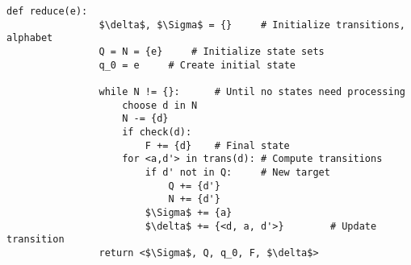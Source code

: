 \documentclass[11pt]{article}
\begin{document}
		\begin{lstlisting}[autogobble=true,mathescape]
			def reduce(e):
				$\delta$, $\Sigma$ = {}		# Initialize transitions, alphabet
				Q = N = {e}		# Initialize state sets
				q_0 = e		# Create initial state
				
				while N != {}:		# Until no states need processing
					choose d in N
					N -= {d}
					if check(d):
						F += {d}	# Final state
					for <a,d'> in trans(d):	# Compute transitions
						if d' not in Q:		# New target
							Q += {d'}
							N += {d'}
						$\Sigma$ += {a}
						$\delta$ += {<d, a, d'>}		# Update transition
				return <$\Sigma$, Q, q_0, F, $\delta$>
		\end{lstlisting}

%		
%		


\end{document}
